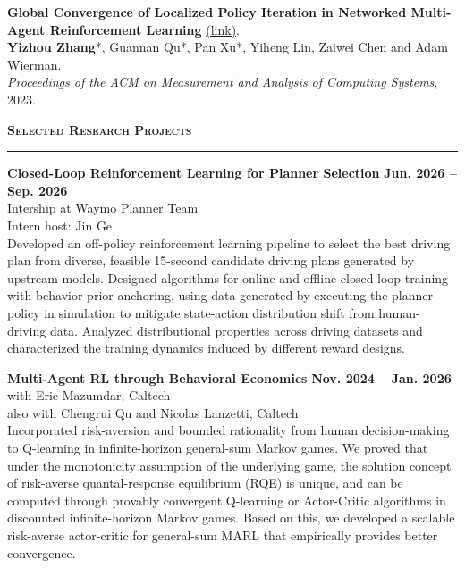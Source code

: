 \documentclass[11pt]{article}
\newcommand{\Me}{\textbf{Yizhou Zhang}}
\newcommand{\Section}[1]{%
  \vspace{0.9\baselineskip}%
  {\large\bfseries\scshape #1}\\[-0.35\baselineskip]
  \rule{\linewidth}{0.4pt}\vspace{0.35\baselineskip}%
}
\begin{document}
\begin{publist}
\item \textbf{Global Convergence of Localized Policy Iteration in Networked Multi-Agent Reinforcement Learning} \href{https://dl.acm.org/doi/10.1145/3579443}{(link)}.\\
\Me*, Guannan Qu*, Pan Xu*, Yiheng Lin, Zaiwei Chen and Adam Wierman.\\
\textit{Proceedings of the ACM on Measurement and Analysis of Computing Systems}, 2023.
\end{publist}

\Section{Selected Research Projects}
\begin{list2}
\item[] {\bf Closed-Loop Reinforcement Learning for Planner Selection} {\hfill \bf Jun. 2026 -- Sep. 2026}\\
Intership at Waymo Planner Team\\
Intern host: Jin Ge\\
Developed an off-policy reinforcement learning pipeline to select the best driving plan from diverse, feasible 15-second candidate driving plans generated by upstream models. Designed algorithms for online and offline closed-loop training with behavior-prior anchoring, using data generated by executing the planner policy in simulation to mitigate state-action distribution shift from human-driving data. Analyzed distributional properties across driving datasets and characterized the training dynamics induced by different reward designs.

\item[] {\bf Multi-Agent RL through Behavioral Economics} {\hfill \bf Nov. 2024 -- Jan. 2026}\\
with Eric Mazumdar, Caltech\\
also with Chengrui Qu and Nicolas Lanzetti, Caltech\\
Incorporated risk-aversion and bounded rationality from human decision-making to Q-learning in infinite-horizon general-sum Markov games. We proved that under the monotonicity assumption of the underlying game, the solution concept of risk-averse quantal-response equilibrium (RQE) is unique, and can be computed through provably convergent Q-learning or Actor-Critic algorithms in discounted infinite-horizon Markov games. Based on this, we developed a scalable risk-averse actor-critic for general-sum MARL that empirically provides better convergence.


\end{list2}
\end{document}
